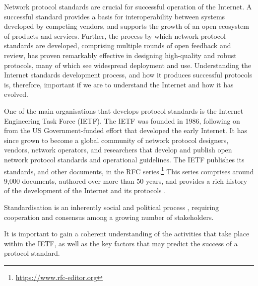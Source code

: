 \documentclass[twocolumn,10pt]{article}
\begin{document}
Network protocol standards are crucial for successful operation of the
Internet.  A successful standard provides a basis for interoperability
between systems developed by competing vendors, and supports the growth of
an open ecosystem of products and services. Further, the process by which
network protocol standards are developed, comprising multiple rounds of
open feedback and review, has proven remarkably effective in designing
high-quality and robust protocols, many of which see widespread deployment
and use. Understanding the Internet standards development process, and how
it produces successful protocols is, therefore, important if we are to
understand the Internet and how it has evolved.

One of the main organisations that develops protocol standards is the
Internet Engineering Task Force (IETF). The IETF was founded in 1986,
following on from the US Government-funded effort that developed the early
Internet. It has since grown to become a global community of network
protocol designers, vendors, network operators, and researchers that
develop and publish open network protocol standards and operational
guidelines.  The IETF publishes its standards, and other documents, in
the RFC series.\footnote{\url{https://www.rfc-editor.org}} This series
comprises around 9,000 documents, authored over more than 50 years,
and provides a rich history of the development of the Internet and
its protocols \cite{RFC8700}.



Standardisation is an inherently social and political process
\cite{RFC2026,RFC7282}, requiring cooperation and consensus among a growing
number of stakeholders.

It is important to gain a coherent understanding of the activities that
take place within the IETF, as well as the key factors that may predict
the success of a protocol standard.


\end{document}
